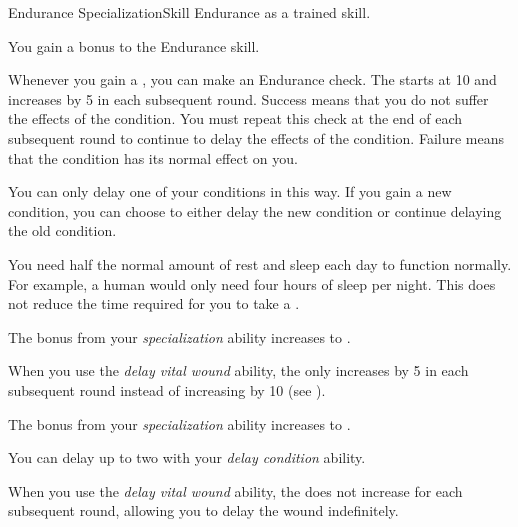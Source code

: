     \begin{feat}{Endurance Specialization}{Skill}
        \featpre Endurance as a trained skill.

         You gain a  bonus to the Endurance skill.

         Whenever you gain a , you can make an Endurance check.
        The  starts at 10 and increases by 5 in each subsequent round.
        Success means that you do not suffer the effects of the condition.
        You must repeat this check at the end of each subsequent round to continue to delay the effects of the condition.
        Failure means that the condition has its normal effect on you.

        You can only delay one of your conditions in this way.
        If you gain a new condition, you can choose to either delay the new condition or continue delaying the old condition.

         You need half the normal amount of rest and sleep each day to function normally.
        For example, a human would only need four hours of sleep per night.
        This does not reduce the time required for you to take a .

         The bonus from your \textit{specialization} ability increases to .

         When you use the \textit{delay vital wound} ability, the  only increases by 5 in each subsequent round instead of increasing by 10 (see ).

         The bonus from your \textit{specialization} ability increases to .

         You can delay up to two  with your \textit{delay condition} ability.

         When you use the \textit{delay vital wound} ability, the  does not increase for each subsequent round, allowing you to delay the wound indefinitely.
    \end{feat}


